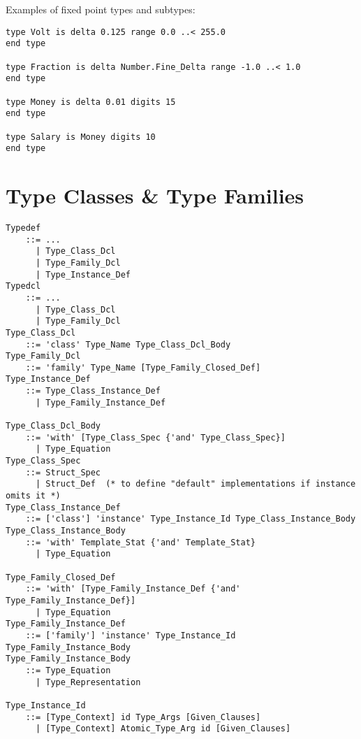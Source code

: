 \example Examples of fixed point types and subtypes:
\begin{lstlisting}
type Volt is delta 0.125 range 0.0 ..< 255.0 
end type

type Fraction is delta Number.Fine_Delta range -1.0 ..< 1.0 
end type

type Money is delta 0.01 digits 15 
end type

type Salary is Money digits 10 
end type
\end{lstlisting}





\section{Type Classes \& Type Families}
\label{sec:type-classes}

\grammar\begin{lstlisting}
Typedef
    ::= ...
      | Type_Class_Dcl
      | Type_Family_Dcl
      | Type_Instance_Def
Typedcl
    ::= ...
      | Type_Class_Dcl
      | Type_Family_Dcl
Type_Class_Dcl
    ::= 'class' Type_Name Type_Class_Dcl_Body
Type_Family_Dcl
    ::= 'family' Type_Name [Type_Family_Closed_Def]
Type_Instance_Def
    ::= Type_Class_Instance_Def
      | Type_Family_Instance_Def
      
Type_Class_Dcl_Body 
    ::= 'with' [Type_Class_Spec {'and' Type_Class_Spec}]
      | Type_Equation
Type_Class_Spec
    ::= Struct_Spec
      | Struct_Def  (* to define "default" implementations if instance omits it *)
Type_Class_Instance_Def
    ::= ['class'] 'instance' Type_Instance_Id Type_Class_Instance_Body
Type_Class_Instance_Body 
    ::= 'with' Template_Stat {'and' Template_Stat}
      | Type_Equation
      
Type_Family_Closed_Def
    ::= 'with' [Type_Family_Instance_Def {'and' Type_Family_Instance_Def}]
      | Type_Equation
Type_Family_Instance_Def
    ::= ['family'] 'instance' Type_Instance_Id Type_Family_Instance_Body
Type_Family_Instance_Body
    ::= Type_Equation
      | Type_Representation

Type_Instance_Id
    ::= [Type_Context] id Type_Args [Given_Clauses]
      | [Type_Context] Atomic_Type_Arg id [Given_Clauses]
\end{lstlisting}



























